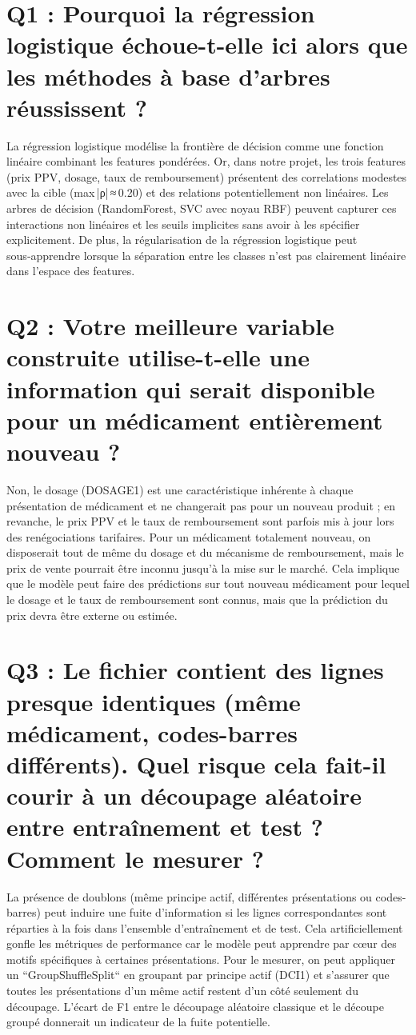 \documentclass[12pt,a4paper]{report}
\begin{document}
\section{Q1 : Pourquoi la régression logistique échoue-t-elle ici alors que les méthodes à base d'arbres réussissent ?}
La régression logistique modélise la frontière de décision comme une fonction linéaire combinant les features pondérées. Or, dans notre projet, les trois features (prix PPV, dosage, taux de remboursement) présentent des correlations modestes avec la cible (max |ρ| ≈ 0.20) et des relations potentiellement non linéaires. Les arbres de décision (RandomForest, SVC avec noyau RBF) peuvent capturer ces interactions non linéaires et les seuils implicites sans avoir à les spécifier explicitement. De plus, la régularisation de la régression logistique peut sous‑apprendre lorsque la séparation entre les classes n'est pas clairement linéaire dans l'espace des features.

\section{Q2 : Votre meilleure variable construite utilise-t-elle une information qui serait disponible pour un médicament entièrement nouveau ?}
Non, le dosage (DOSAGE1) est une caractéristique inhérente à chaque présentation de médicament et ne changerait pas pour un nouveau produit ; en revanche, le prix PPV et le taux de remboursement sont parfois mis à jour lors des renégociations tarifaires. Pour un médicament totalement nouveau, on disposerait tout de même du dosage et du mécanisme de remboursement, mais le prix de vente pourrait être inconnu jusqu'à la mise sur le marché. Cela implique que le modèle peut faire des prédictions sur tout nouveau médicament pour lequel le dosage et le taux de remboursement sont connus, mais que la prédiction du prix devra être externe ou estimée.

\section{Q3 : Le fichier contient des lignes presque identiques (même médicament, codes-barres différents). Quel risque cela fait-il courir à un découpage aléatoire entre entraînement et test ? Comment le mesurer ?}
La présence de doublons (même principe actif, différentes présentations ou codes-barres) peut induire une fuite d'information si les lignes correspondantes sont réparties à la fois dans l'ensemble d'entraînement et de test. Cela artificiellement gonfle les métriques de performance car le modèle peut apprendre par cœur des motifs spécifiques à certaines présentations. Pour le mesurer, on peut appliquer un ``GroupShuffleSplit`` en groupant par principe actif (DCI1) et s'assurer que toutes les présentations d'un même actif restent d'un côté seulement du découpage. L'écart de F1 entre le découpage aléatoire classique et le découpe groupé donnerait un indicateur de la fuite potentielle.
\end{document}

